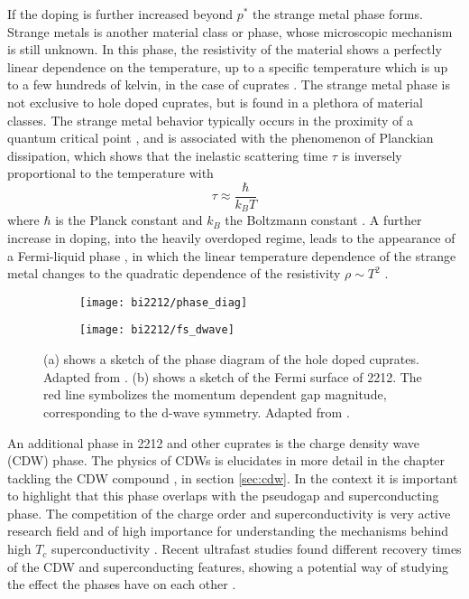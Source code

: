 If the doping is further increased beyond $p^*$ the strange metal phase forms.
Strange metals is another material class or phase, whose microscopic mechanism is still unknown.
In this phase, the resistivity of the material shows a perfectly linear dependence on the temperature, up to a specific temperature which is up to a few hundreds of kelvin, in the case of cuprates \cite{martin_normal-state_1990,daou_linear_2009,cooper_anomalous_2009}.
The strange metal phase is not exclusive to hole doped cuprates, but is found in a plethora of material classes.
The strange metal behavior typically occurs in the proximity of a quantum critical point \cite{cooper_anomalous_2009,varma_singular_2002,marel_quantum_2003}, and is associated with the phenomenon of Planckian dissipation, which shows that the inelastic scattering time $\tau$ is inversely proportional to the temperature with
\begin{equation}
	\tau \approx \frac{\hbar}{k_BT}
\end{equation}
where $\hbar$ is the Planck constant and $k_B$ the Boltzmann constant \cite{ataei_electrons_2022,bruin_similarity_2013}.
A further increase in doping, into the heavily overdoped regime, leads to the appearance of a Fermi-liquid phase \cite{barisic_evidence_2019}, in which the linear temperature dependence of the strange metal changes to the quadratic dependence of the resistivity $\rho\sim T^2$ \cite{nakamae_electronic_2003,hussey_coherent_2003,plate_fermi_2005}.

\begin{figure}[t]
	\centering
	\begin{subfigure}[b]{0.49\textwidth}
		\texttt{[image: bi2212/phase\_diag]}
		\caption{}
	\end{subfigure}
	\begin{subfigure}[b]{0.45\textwidth}
		\texttt{[image: bi2212/fs\_dwave]}
		\caption{}
	\end{subfigure}
	\caption{(a) shows a sketch of the phase diagram of the hole doped cuprates. Adapted from \cite{keimer_quantum_2015}. (b) shows a sketch of the Fermi surface of 2212. The red line symbolizes the momentum dependent gap magnitude, corresponding to the d-wave symmetry. Adapted from \cite{zhang_photoinduced_2017}.}
	\label{fig:phase_diag}
\end{figure}

An additional phase in 2212 and other cuprates is the charge density wave (CDW) phase.
The physics of CDWs is elucidates in more detail in the chapter tackling the CDW compound , in section \ref{sec:cdw}.
In the context it is important to highlight that this phase overlaps with the pseudogap and superconducting phase.
The competition of the charge order and superconductivity is very active research field and of high importance for understanding the mechanisms behind high $T_c$ superconductivity \cite{arpaia_charge_2021}.
Recent ultrafast studies found different recovery times of the CDW and superconducting features, showing a potential way of studying the effect the phases have on each other \cite{wandel_enhanced_2022}.

